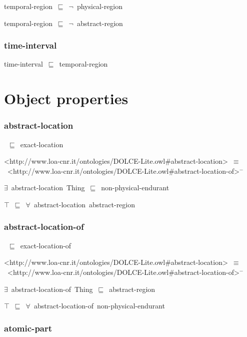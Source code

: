 \documentclass{article}
\begin{document}
temporal-region~\ensuremath{\sqsubseteq}~\ensuremath{\lnot}~physical-region

temporal-region~\ensuremath{\sqsubseteq}~\ensuremath{\lnot}~abstract-region

\subsubsection*{time-interval}

time-interval~\ensuremath{\sqsubseteq}~temporal-region~

\section*{Object properties}\subsubsection*{abstract-location}

~\ensuremath{\sqsubseteq}~exact-location

<http://www.loa-cnr.it/ontologies/DOLCE-Lite.owl#abstract-location>~\ensuremath{\equiv}~<http://www.loa-cnr.it/ontologies/DOLCE-Lite.owl#abstract-location-of>\ensuremath{^-}

\ensuremath{\exists}~abstract-location~Thing~\ensuremath{\sqsubseteq}~non-physical-endurant

\ensuremath{\top}~\ensuremath{\sqsubseteq}~\ensuremath{\forall}~abstract-location~abstract-region

\subsubsection*{abstract-location-of}

~\ensuremath{\sqsubseteq}~exact-location-of

<http://www.loa-cnr.it/ontologies/DOLCE-Lite.owl#abstract-location>~\ensuremath{\equiv}~<http://www.loa-cnr.it/ontologies/DOLCE-Lite.owl#abstract-location-of>\ensuremath{^-}

\ensuremath{\exists}~abstract-location-of~Thing~\ensuremath{\sqsubseteq}~abstract-region

\ensuremath{\top}~\ensuremath{\sqsubseteq}~\ensuremath{\forall}~abstract-location-of~non-physical-endurant

\subsubsection*{atomic-part}
\end{document}

